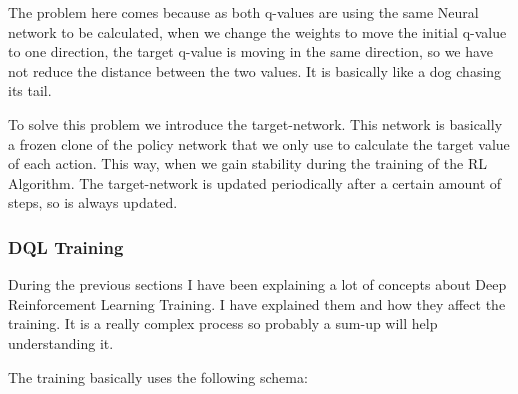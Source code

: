 			The problem here comes because as both q-values are using the same Neural network to be calculated, when we change the weights to move the initial q-value to one direction, the target q-value is moving in the same direction, so we have not reduce the distance between the two values. It is basically like a dog chasing its tail.
			
			To solve this problem we introduce the target-network. This network is basically a frozen clone of the policy network that we only use to calculate the target value of each action. This way, when we gain stability during the training of the RL Algorithm. The target-network is updated periodically after a certain amount of steps, so is always updated.
			
			
		\subsubsection{DQL Training}
			
			During the previous sections I have been explaining a lot of concepts about Deep Reinforcement Learning Training. I have explained them and how they affect the training. It is a really complex process so probably a sum-up will help understanding it.
		
			The training basically uses the following schema:
			
